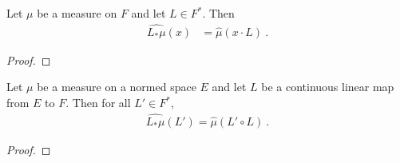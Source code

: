 \begin{lemma}\label{lem:charFun_map_eq_charFunDual_smul}
  \mathlibok
Let $\mu$ be a measure on $F$ and let $L \in F^*$. Then
\begin{align*}
  \widehat{L_*\mu}(x) &= \hat{\mu}(x \cdot L) \: .
\end{align*}
\end{lemma}

\begin{proof}\leanok

\end{proof}


\begin{lemma}\label{lem:charFunDual_map}
  \mathlibok
Let $\mu$ be a measure on a normed space $E$ and let $L$ be a continuous linear map from $E$ to $F$.
Then for all $L' \in F^*$,
\begin{align*}
  \widehat{L_*\mu}(L') = \hat{\mu}(L' \circ L) \: .
\end{align*}
\end{lemma}

\begin{proof}\leanok

\end{proof}

